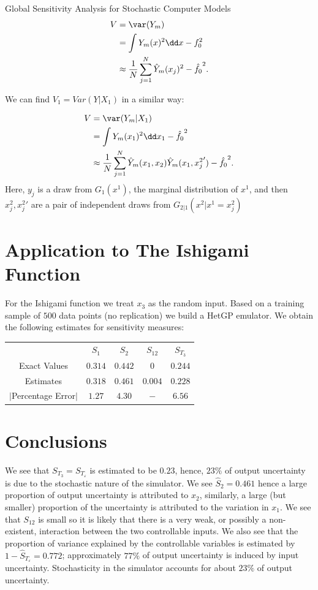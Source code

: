 \begin{chapter}{Global Sensitivity Analysis for Stochastic Computer Models}
\begin{align}
	V & = \var(Y_m) \\
	  & = \int Y_m(x)^2 \dd x - f_0^2 \\
	  & \approx \frac{1}{N} \sum_{j = 1}^N \hat{Y}_m(x_j)^2 - \hat{f_0}^2.
\end{align}

We can find $V_1 = Var(Y | X_1)$ in a similar way:

\begin{align}
	V & = \var(Y_m|X_1) \\
	  & = \int Y_m(x_1)^2 \dd x_1 - \hat{f_0}^2 \\
	  & \approx \frac{1}{N} \sum_{j = 1}^N \hat{Y}_m(x_1, x_2)\hat{Y}_m(x_1, {x^{2}_j}' ) - \hat{f_0}^2.
\end{align}
Here, $y_j$ is a draw from $G_1(x^1)$, the marginal distribution of $x^1$, and then $x^2_j, {x^{2}_j}'$ are a pair of independent draws from $G_{2|1}(x^2| x^1 = x^2_j)$

\section{Application to The Ishigami Function}

For the Ishigami function we treat $x_3$ as the random input. Based on a training sample of $500$ data points (no replication) we build a HetGP emulator. We obtain the following estimates for sensitivity measures:

\begin{table}[h]
	\centering
	\begin{tabular}{ccccc}
	\toprule
	& $S_1$ & $S_2$ & $S_{12}$ & $S_{T_3}$ \\ \cmidrule{1-5}
	Exact Values& $0.314$ & $0.442$ & $0$ & $0.244$ \\
	Estimates& $0.318$ & $0.461$ & $0.004$ & $0.228$\\
	$|$Percentage Error$|$& $1.27$ & $4.30$ & $-$ & $6.56$ \\\bottomrule
	\end{tabular}
\end{table}
\section{Conclusions}

We see that $S_{T_3} = S_{T_\varepsilon}$ is estimated to be $0.23$, hence, $23\%$  of output uncertainty is due to the stochastic nature of the simulator. We see $\hat{S}_2 = 0.461$ hence a large proportion of output uncertainty is attributed to $x_2$, similarly, a large (but smaller) proportion of the uncertainty is attributed to the variation in $x_1$. We see that $S_{12}$ is small so it is likely that there is a very weak, or possibly a non-existent, interaction between the two controllable inputs. We also see that the proportion of variance explained by the controllable variables is estimated by $1 - \hat{S}_{T_\varepsilon} = 0.772$; approximately $77\%$ of output uncertainty is induced by input uncertainty. Stochasticity in the simulator accounts for about $23\%$ of output uncertainty.


\end{chapter}
